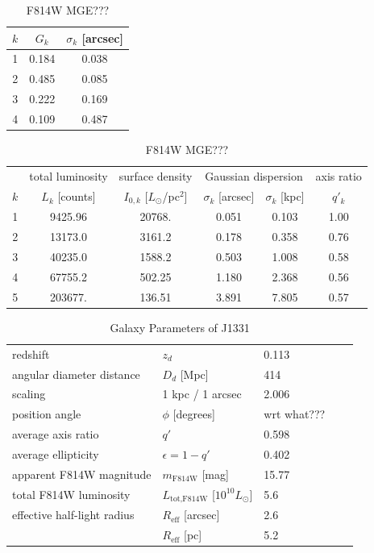 \documentclass[useAMS,usenatbib]{mn2e}
\begin{document}
\begin{table}
\centering
\begin{minipage}[t]{40mm}
\caption{PSF F814W MGE ??????}
\begin{tabular}{ccc}
\hline
$k$ & $G_k$ & $\sigma_k$ [arcsec] \\\hline
1 & 0.184 & 0.038\\
2 & 0.485 & 0.085\\
3 & 0.222 & 0.169\\
4 & 0.109 & 0.487\\\hline
\end{tabular}
\label{tab:PSFMGEF814W}
\end{minipage}
\hspace{10mm}
\begin{minipage}[t]{100mm}
\caption{F814W MGE???}
\begin{tabular}{cccccc}
\hline
 & total luminosity  & surface density & \multicolumn{2}{c}{Gaussian dispersion} & axis ratio\\
$k$  & $L_k$ [counts] & $I_{0,k}$ [$L_\odot$/pc$^2$] & $\sigma_k$ [arcsec] & $\sigma_k$ [kpc] & $q'_k$\\\hline
1  &     9425.96 &      20768.  &  0.051   & 0.103  & 1.00\\
2  &    13173.0 &        3161.2 &  0.178   & 0.358  & 0.76\\
3  &    40235.0 &        1588.2 &  0.503   & 1.008  & 0.58\\
4  &    67755.2 &         502.25&  1.180   & 2.368  & 0.56\\
5  &    203677. &         136.51&  3.891   & 7.805  & 0.57\\\hline
\end{tabular}
\label{tab:MGEF814W}
\end{minipage}
\end{table}

\begin{table}
\centering
\begin{minipage}{140mm}
\caption{Galaxy Parameters of J1331}
\begin{tabular}{lllrl}
\hline
redshift                  & $z_d$ & 0.113 & \citep{SWELLSIII}\\
angular diameter distance & $D_d$ [Mpc] & 414 & \\
scaling                   & 1 kpc / 1 arcsec & 2.006 & \\
position angle            & $\phi$ [degrees] & wrt what???\\
average axis ratio & $q'$ & 0.598\\
average ellipticity & $\epsilon = 1 - q'$ & 0.402 & \\
apparent F814W magnitude & $m_\text{F814W}$ [mag] & 15.77 & \\
total F814W luminosity & $L_\text{tot,F814W}$ [$10^{10} L_\odot$] & 5.6 & \\
effective half-light radius & $R_\text{eff}$ [arcsec] & 2.6 & \\
& $R_\text{eff}$ [pc]& 5.2 & \\
\hline
\end{tabular}
\end{minipage}
\end{table}
\end{document}
